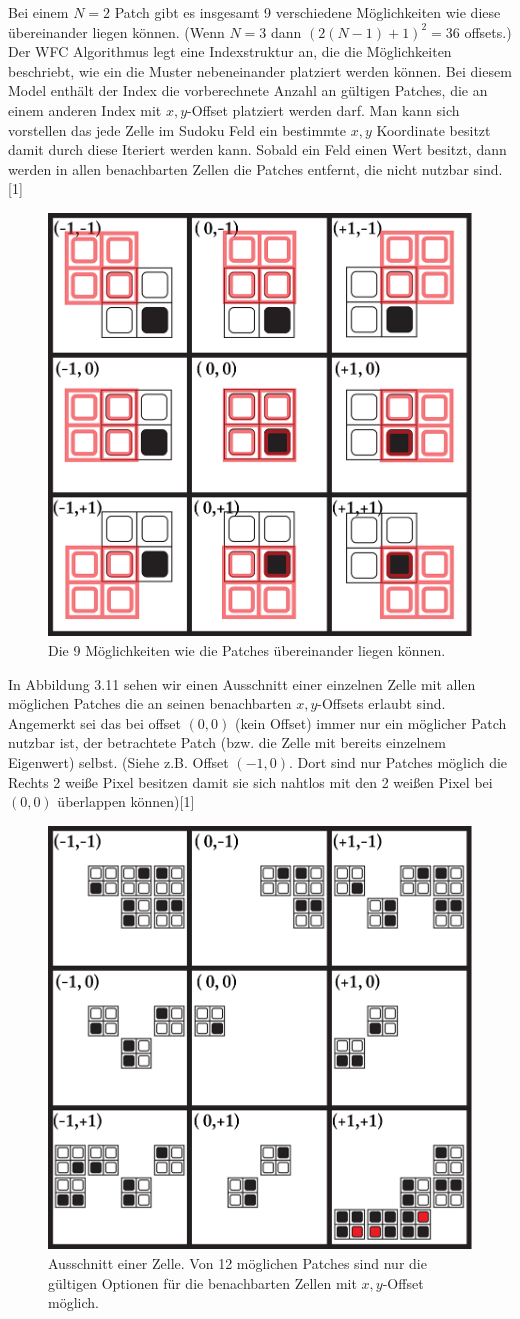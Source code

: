 \documentclass[12pt, a4paper,twoside,openright]{report}
\begin{document}
Bei einem $N = 2$ Patch gibt es insgesamt 9 verschiedene Möglichkeiten wie diese übereinander liegen können.
{(Wenn $N = 3$ dann $(2(N - 1) + 1)^2 = 36$ offsets.)}
Der WFC Algorithmus legt eine Indexstruktur an, die die Möglichkeiten beschriebt, wie ein die Muster nebeneinander platziert werden können.
Bei diesem Model enthält der Index die vorberechnete Anzahl an gültigen Patches, die an einem anderen Index mit $x,y$-Offset platziert werden darf. 
Man kann sich vorstellen das jede Zelle im Sudoku Feld ein bestimmte $x,y$ Koordinate besitzt damit durch diese Iteriert werden kann.
Sobald ein Feld einen Wert besitzt, dann werden in allen benachbarten Zellen die Patches entfernt, die nicht nutzbar sind. {[1]}

\begin{figure}[H]
    \centering
    \includegraphics[width=0.5\linewidth]{images/red-maze-offset.png}%
    \caption{Die 9 Möglichkeiten wie die Patches übereinander liegen können.}%
\end{figure}

In Abbildung 3.11 sehen wir einen Ausschnitt einer einzelnen Zelle mit allen möglichen Patches die an seinen benachbarten $x,y$-Offsets erlaubt sind.
Angemerkt sei das bei offset $(0,0)$ {(kein Offset)} immer nur ein möglicher Patch nutzbar ist, der betrachtete Patch {(bzw. die Zelle mit bereits einzelnem Eigenwert)} selbst.
{(Siehe z.B. Offset $(-1,0)$. Dort sind nur Patches möglich die Rechts 2 weiße Pixel besitzen damit sie sich nahtlos mit den 2 weißen Pixel bei $(0,0)$ überlappen können)}{[1]}

\begin{figure}[H]
    \centering
    \includegraphics[width=0.5\linewidth]{images/red-maze-offset-example.png}%
    \caption{Ausschnitt einer Zelle. Von 12 möglichen Patches sind nur die gültigen Optionen für die benachbarten Zellen mit $x,y$-Offset möglich.}%
\end{figure}
\end{document}
